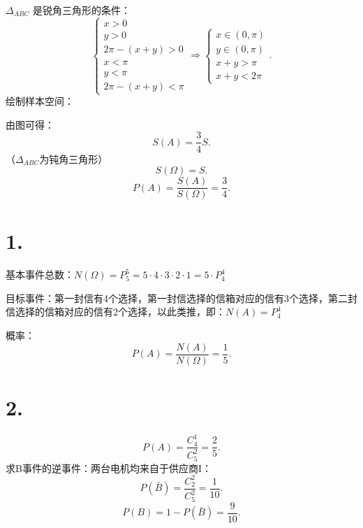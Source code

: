 $\Delta_{ABC}$ 是锐角三角形的条件：\[
    \begin{cases}
        x>0\\
        y>0\\
        2\pi-\left( x+y \right) >0\\
        x<\pi\\
        y<\pi\\
        2\pi-\left( x+y \right) <\pi
    \end{cases}
    \Rightarrow
    \begin{cases}
        x\in \left( 0,\pi \right) \\
        y\in \left( 0,\pi \right)\\
        x+y>\pi\\
        x+y<2\pi
    \end{cases}
.\] 
绘制样本空间：
\begin{center}
\end{center}
由图可得：\[
    S\left( A \right) =\frac{3}{4}S
.\] （$\Delta_{ABC}$为钝角三角形）
\[
    S\left( \Omega \right) =S
.\] 
\[
    P\left( A \right) =\frac{S\left( A \right) }{S\left( \Omega \right) }=\frac{3}{4}
.\] 

\section{1.}%
\label{sec:1.}
基本事件总数：$N\left( \Omega \right) =P_{5}^{5}=5\cdot 4\cdot 3\cdot 2\cdot 1=5\cdot P_{4}^{4}$

目标事件：第一封信有4个选择，第一封信选择的信箱对应的信有3个选择，第二封信选择的信箱对应的信有2个选择，以此类推，即：$N\left( A \right) =P_{4}^{4}$

概率：\[
    P\left( A \right) =\frac{N\left( A \right) }{N\left( \Omega \right) }=\frac{1}{5}
.\] 

\section{2.}%
\label{sec:2.}
\[
    P\left( A \right) =\frac{C_{4}^{1}}{C_{5}^{2}}=\frac{2}{5}
.\] 
求B事件的逆事件：两台电机均来自于供应商I：
\[
    P\left( \bar{B} \right) =\frac{C_{2}^{2}}{C_{5}^{2}}=\frac{1}{10}
.\] 
\[
    P\left( B \right) =1-P\left( \bar{B} \right) =\frac{9}{10}
.\] 

